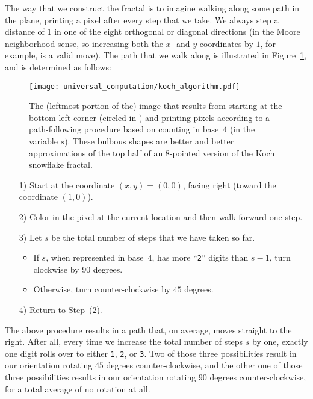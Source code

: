 The way that we construct the fractal is to imagine walking along some path in the plane, printing a pixel after every step that we take. We always step a distance of $1$ in one of the eight orthogonal or diagonal directions (in the Moore neighborhood  sense, so increasing both the $x$- and $y$-coordinates by $1$, for example, is a valid move). The path that we walk along is illustrated in Figure~\ref{fig:koch_algorithm}, and is determined as follows:\smallskip

\begin{figure}[!htb]
	\centering
	\texttt{[image: universal\_computation/koch\_algorithm.pdf]}
	\caption{The (leftmost portion of the) image that results from starting at the bottom-left corner (circled in ) and printing pixels according to a path-following procedure based on counting in base~$4$ (in the variable $s$). These bulbous shapes are better and better approximations of the top half of an 8-pointed version of the Koch snowflake fractal.}\label{fig:koch_algorithm}
\end{figure}


\clearpage%


\begin{itemize}
	\item[1)] Start at the coordinate $(x,y) = (0,0)$, facing right (toward the coordinate $(1,0)$).\smallskip
	
	\item[2)] Color in the pixel at the current location and then walk forward one step.\smallskip
	
	\item[3)] Let $s$ be the total number of steps that we have taken so far.\smallskip
	\begin{itemize}
		\item If $s$, when represented in base~$4$, has more ``\texttt{2}'' digits than $s-1$, turn clockwise by $90$ degrees.\smallskip
		
		\item Otherwise, turn counter-clockwise by $45$ degrees.\smallskip
	\end{itemize}
	
	\item[4)] Return to Step~(2).\smallskip
\end{itemize}

The above procedure results in a path that, on average, moves straight to the right. After all, every time we increase the total number of steps $s$ by one, exactly one digit rolls over to either \texttt{1}, \texttt{2}, or \texttt{3}. Two of those three possibilities result in our orientation rotating $45$ degrees counter-clockwise, and the other one of those three possibilities results in our orientation rotating $90$ degrees counter-clockwise, for a total average of no rotation at all.

